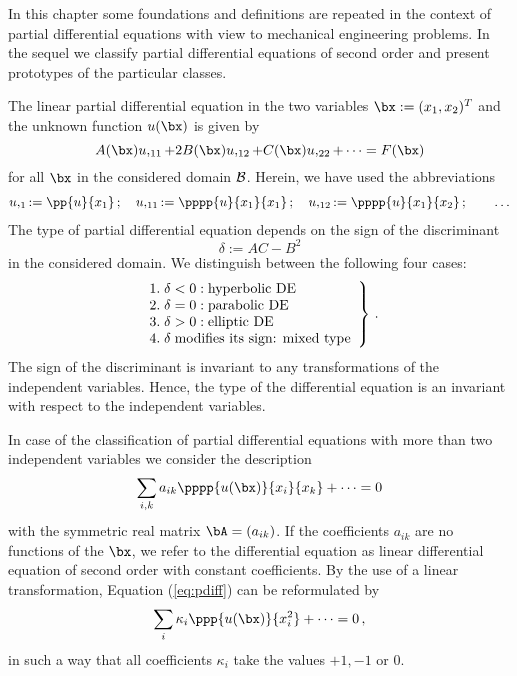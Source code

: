 \label{Section21}
In this chapter some foundations and definitions are 
repeated in the context of partial differential equations 
with view to mechanical engineering problems. 
In the sequel we classify partial differential 
equations of second order and present prototypes of the 
particular classes. 

The linear partial differential equation in the two 
variables $\bx := (x_1 , x_2)^T$ and the unknown function 
$u (\bx )$ is given by 
%
\begin{equation}
  A(\bx) u,_{11} + 2 B(\bx) u,_{12} + C(\bx) u,_{22} + \dots
  = F(\bx) 
\label{eq:allgdgl}
\end{equation}
%
for all $\bx$ in the considered domain ${\cal B}$. 
Herein, we have used the abbreviations 
%
\begin{eqnarray}
  u,_{1} :=  \pp{u}{x_1} \, ; \quad u,_{11}  :=  \pppp{u}{x_1}{x_1} \, ; 
  \quad u,_{12} := \pppp{u}{x_1}{x_2} 
  \, ; \qquad \dots 
\end{eqnarray}
%
The type of partial differential equation depends on the 
sign of the discriminant 
%
\begin{equation}
\delta := AC-B^2
\label{eq:ac-b^2}
\end{equation}
%
in the considered domain. 
We distinguish between the following four cases: 
%
\begin{eqnarray}
\left. 
\begin{array}{l}
1. \; \delta < 0 : \textnormal{hyperbolic DE} \\
2. \; \delta = 0 : \textnormal{parabolic DE} \\
3. \; \delta > 0 : \textnormal{elliptic DE} \\
4. \; \delta \; \textnormal{modifies its sign: mixed type} \\
\end{array}
\right\} \, . 
\end{eqnarray}
%
The sign of the discriminant is invariant to any 
transformations of the independent variables. 
Hence, the type of the differential equation is an 
invariant with respect to the independent variables. 

In case of the classification of partial differential 
equations with more than two independent variables we 
consider the description 
%
\begin{equation}
\sum_{i,k} a_{ik} \pppp{u( \bx )}{x_i}{x_k} + \dots = 0
\label{eq:pdiff}
\end{equation}
%
with the symmetric real matrix $\bA = (a_{ik})$. 
If the coefficients $a_{ik}$ are no functions of the 
$\bx$, we refer to the differential equation as linear 
differential equation of second order with constant 
coefficients. 
By the use of a linear transformation, Equation 
(\ref{eq:pdiff}) can be reformulated by 
%
\begin{equation}
\sum_{i} \kappa_i \ppp{u (\bx )}{x_i^2}+ \dots = 0 \, ,
\end{equation}
%
in such a way that all coefficients $\kappa_i$ take the 
values $+1, -1$ or $0$. 

